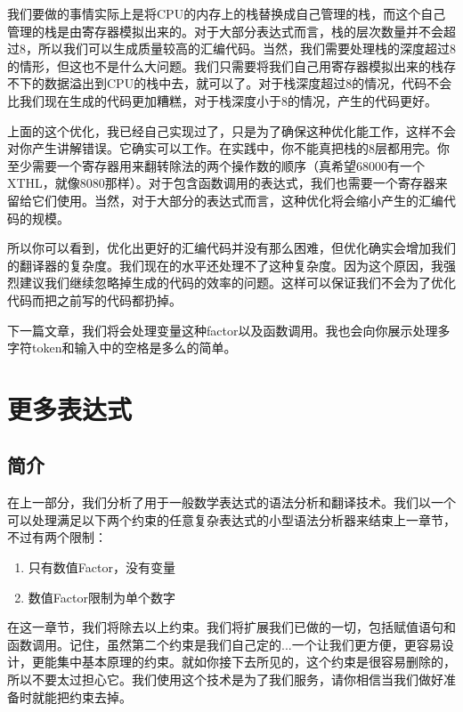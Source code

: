 我们要做的事情实际上是将CPU的内存上的栈替换成自己管理的栈，而这个自己管理的栈是由寄存器模拟出来的。对于大部分表达式而言，栈的层次数量并不会超过8，所以我们可以生成质量较高的汇编代码。当然，我们需要处理栈的深度超过8的情形，但这也不是什么大问题。我们只需要将我们自己用寄存器模拟出来的栈存不下的数据溢出到CPU的栈中去，就可以了。对于栈深度超过8的情况，代码不会比我们现在生成的代码更加糟糕，对于栈深度小于8的情况，产生的代码更好。

上面的这个优化，我已经自己实现过了，只是为了确保这种优化能工作，这样不会对你产生讲解错误。它确实可以工作。在实践中，你不能真把栈的8层都用完。你至少需要一个寄存器用来翻转除法的两个操作数的顺序（真希望68000有一个XTHL，就像8080那样）。对于包含函数调用的表达式，我们也需要一个寄存器来留给它们使用。当然，对于大部分的表达式而言，这种优化将会缩小产生的汇编代码的规模。

所以你可以看到，优化出更好的汇编代码并没有那么困难，但优化确实会增加我们的翻译器的复杂度。我们现在的水平还处理不了这种复杂度。因为这个原因，我强烈建议我们继续忽略掉生成的代码的效率的问题。这样可以保证我们不会为了优化代码而把之前写的代码都扔掉。

下一篇文章，我们将会处理变量这种factor以及函数调用。我也会向你展示处理多字符token和输入中的空格是多么的简单。

\chapter{更多表达式}

\section{简介}

在上一部分，我们分析了用于一般数学表达式的语法分析和翻译技术。我们以一个可以处理满足以下两个约束的任意复杂表达式的小型语法分析器来结束上一章节，不过有两个限制：

\begin{enumerate}
   \item 只有数值Factor，没有变量
   \item 数值Factor限制为单个数字
\end{enumerate}

在这一章节，我们将除去以上约束。我们将扩展我们已做的一切，包括赋值语句和函数调用。记住，虽然第二个约束是我们自己定的...一个让我们更方便，更容易设计，更能集中基本原理的约束。就如你接下去所见的，这个约束是很容易删除的，所以不要太过担心它。我们使用这个技术是为了我们服务，请你相信当我们做好准备时就能把约束去掉。

